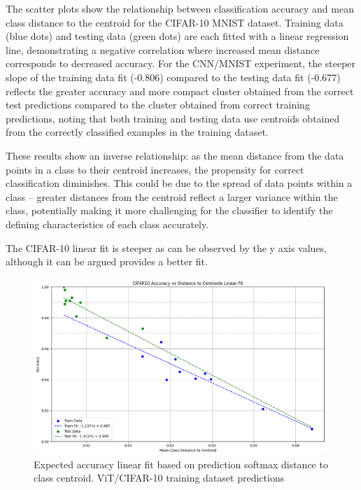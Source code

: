 The scatter plots show the relationship between classification accuracy and mean class distance to the centroid for the CIFAR-10 MNIST dataset. Training data (blue dots) and testing data (green dots) are each fitted with a linear regression line, demonstrating a negative correlation where increased mean distance corresponds to decreased accuracy. For the CNN/MNIST experiment, the steeper slope of the training data fit (-0.806) compared to the testing data fit (-0.677) reflects the greater accuracy and more compact cluster obtained from the correct test predictions compared to the cluster obtained from correct training predictions, noting that both training and testing data use centroids obtained from the correctly classified examples in the training dataset.

These results show an inverse relationship: as the mean distance from the data points in a class to their centroid increases, the propensity for correct classification diminishes. This could be due to the spread of data points within a class – greater distances from the centroid reflect a larger variance within the class, potentially making it more challenging for the classifier to identify the defining characteristics of each class accurately.

The CIFAR-10 linear fit is steeper as can be observed by the y axis values, although it can be argued provides a better fit.

\begin{figure}[ht]
    \centering
    \includegraphics[width=0.99\textwidth]{Figures/CIFAR10_plot_accuracy_vs_distance_linear_fit.png}
    \caption{Expected accuracy linear fit based on prediction softmax distance to class centroid. ViT/CIFAR-10 training dataset predictions}
\label{fig:CIFAR10_plot_accuracy_vs_distance_linear_fit}
\end{figure}

